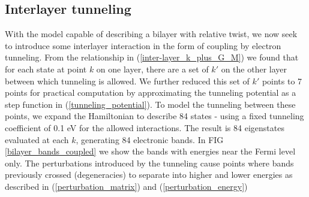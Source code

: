 \documentclass[12pt]{report} %
\begin{document}
\subsection*{Interlayer tunneling}
With the model capable of describing a bilayer with relative twist, we now seek to introduce some interlayer interaction in the form of coupling by electron tunneling. From the relationship in (\ref{inter-layer_k_plus_G_M}) we found that for each state at point $k$ on one layer, there are a set of $k'$ on the other layer between which tunneling is allowed. We further reduced this set of $k'$ points to 7 points for practical computation by approximating the tunneling potential as a step function in (\ref{tunneling_potential}). To model the tunneling between these points, we expand the Hamiltonian to describe 84 states - using a fixed tunneling coefficient of 0.1 eV for the allowed interactions. The result is 84 eigenstates evaluated at each $k$, generating 84 electronic bands. In FIG \ref{bilayer_bands_coupled} we show the bands with energies near the Fermi level only. The perturbations introduced by the tunneling cause points where bands previously crossed (degeneracies) to separate into higher and lower energies as described in (\ref{perturbation_matrix}) and (\ref{perturbation_energy})
%
\end{document}
